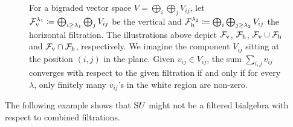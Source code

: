 \documentclass[\MainFolder/Text.tex]{subfiles}
\begin{document}
\begin{figure}[t]\label{Fig:FiltrationTypes}
\centering




\caption[Natural filtrations of a bigraded vector space.]{For a bigraded vector space $V = \bigoplus_{i} \bigoplus_{j} V_{ij}$, let $\mathcal{F}^{\lambda_1}_{{\mathrm{v}}}\coloneqq\bigoplus_{i\ge \lambda_1}\bigoplus_{j} V_{ij}$ be the vertical and $\smash{\mathcal{F}^{\lambda_2}_{{\mathrm{h}}}}\coloneqq\bigoplus_{i}\bigoplus_{j\ge \lambda_2} V_{ij}$ the horizontal filtration. The illustrations above depict $\mathcal{F}_{{\mathrm{v}}}$, $\mathcal{F}_{{\mathrm{h}}}$, $\mathcal{F}_{{\mathrm{v}}}\cup\mathcal{F}_{{\mathrm{h}}}$ and $\mathcal{F}_{{\mathrm{v}}}\cap \mathcal{F}_{{\mathrm{h}}}$, respectively. We imagine the component $V_{ij}$ sitting at the position $(i,j)$ in the plane. Given $v_{ij}\in V_{ij}$, the sum $\sum_{i,j} v_{ij}$ converges with respect to the given filtration if and only if for every $\lambda$, only finitely many $v_{ij}$'s in the white region are non-zero.}
\end{figure}

The following example shows that $\mathrm{S} U$ might not be a filtered bialgebra with respect to combined filtrations.
\end{document}
